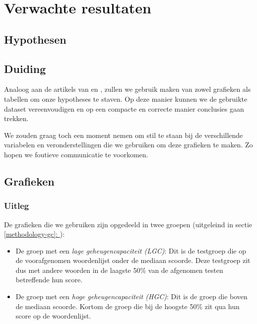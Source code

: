 \documentclass{hogent-article}
\newcommand{\customref}[1]{\underline{\ref{#1}: \nameref{#1}}}
\begin{document}
\section{Verwachte resultaten}

\subsection{Hypothesen}

\subsection{Duiding}

Analoog aan de artikels van \cite{HenryRoediger2006} en \cite{Agarwal2008}, zullen we gebruik maken van zowel grafieken als tabellen om onze hypotheses te staven. Op deze manier kunnen we de gebruikte dataset vereenvoudigen en op een compacte en correcte manier conclusies gaan trekken.\\
\par
\noindent
We zouden graag toch een moment nemen om stil te staan bij de verschillende variabelen en veronderstellingen die we gebruiken om deze grafieken te maken. Zo hopen we foutieve communicatie te voorkomen.

\subsection{Grafieken}
\subsubsection{Uitleg}
De grafieken die we gebruiken zijn opgedeeld in twee groepen (uitgeleind in sectie \customref{methodology-gc}):
\begin{itemize}
	\item De groep met een \textit{lage geheugencapaciteit (LGC)}: Dit is de testgroep die op de voorafgenomen woordenlijst onder de mediaan scoorde. Deze testgroep zit dus met andere woorden in de laagste 50\% van de afgenomen testen betreffende hun score.
	\item De groep met een \textit{hoge geheugencapaciteit (HGC)}: Dit is de groep die boven de mediaan scoorde. Kortom de groep die bij de hoogste 50\% zit qua hun score op de woordenlijst.
\end{itemize}
\end{document}
